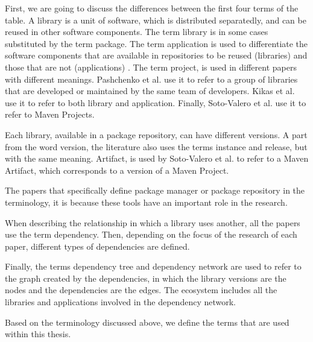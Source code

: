 \blankls
First, we are going to discuss the differences between the first four terms of the table. A library is a unit of software, which is distributed separatedly, and can be reused in other software components. The term library is in some cases substituted by the term package. The term application is used to differentiate the software components that are available in repositories to be reused (libraries) and those that are not (applications) \cite{kikas2017structure}.
The term project, is used in different papers with different meanings. Pashchenko et al. \cite{pashchenko2018vulnerable} use it to refer to a group of libraries that are developed or maintained by the same team of developers. Kikas et al. \cite{kikas2017structure} use it to refer to both library and application. Finally, Soto-Valero et al. use it to refer to Maven Projects.

Each library, available in a package repository, can have different versions. A part from the word version, the literature also uses the terms instance and release, but with the same meaning. Artifact, is used by Soto-Valero et al. to refer to a Maven Artifact, which corresponds to a version of a Maven Project.

The papers that specifically define package manager or package repository in the terminology, it is because these tools have an important role in the research.

When describing the relationship in which a library uses another, all the papers use the term dependency. Then, depending on the focus of the research of each paper, different types of dependencies are defined.


Finally, the terms dependency tree and dependency network are used to refer to the graph created by the dependencies, in which the library versions are the nodes and the dependencies are the edges. The ecosystem includes all the libraries and applications involved in the dependency network.

\blankl
Based on the terminology discussed above, we define the terms that are used within this thesis.

